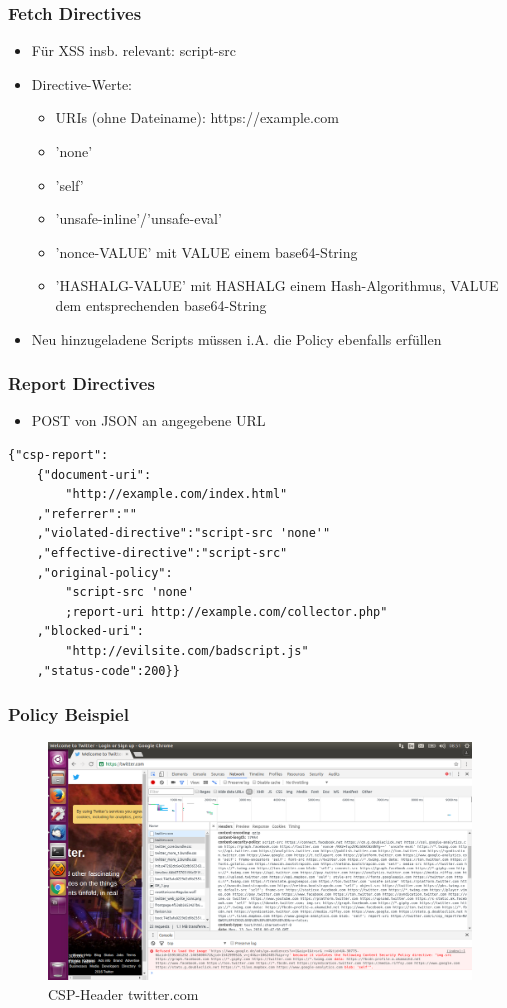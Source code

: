 \documentclass[handout]{beamer}
\begin{document}
\begin{frame}
\frametitle{Fetch Directives}
\begin{itemize}
\item Für XSS insb. relevant: script-src
\item Directive-Werte:
\begin{itemize}
\item URIs (ohne Dateiname): https://example.com
\item 'none'
\item 'self'
\item 'unsafe-inline'/'unsafe-eval'
\item 'nonce-VALUE' mit VALUE einem base64-String
\item 'HASHALG-VALUE' mit HASHALG einem Hash-Algorithmus, VALUE dem entsprechenden base64-String
\end{itemize}
\item Neu hinzugeladene Scripts müssen i.A. die Policy ebenfalls erfüllen
\end{itemize}
\end{frame}


\begin{frame}[fragile]
\frametitle{Report Directives}
\begin{itemize}
\item POST von JSON an angegebene URL
\end{itemize}
\begin{lstlisting}[breaklines=true]
{"csp-report":
	{"document-uri":
		"http://example.com/index.html"
	,"referrer":""
	,"violated-directive":"script-src 'none'"
	,"effective-directive":"script-src"
	,"original-policy":
		"script-src 'none'
		;report-uri http://example.com/collector.php"
	,"blocked-uri":
		"http://evilsite.com/badscript.js"
	,"status-code":200}}
\end{lstlisting}
\end{frame}


\begin{frame}
\frametitle{Policy Beispiel}
\begin{figure}[ht]
	\centering
	\includegraphics[width=12cm]{twitter_csp.png}
	\caption{CSP-Header twitter.com}
\end{figure}
\end{frame}
\end{document}
